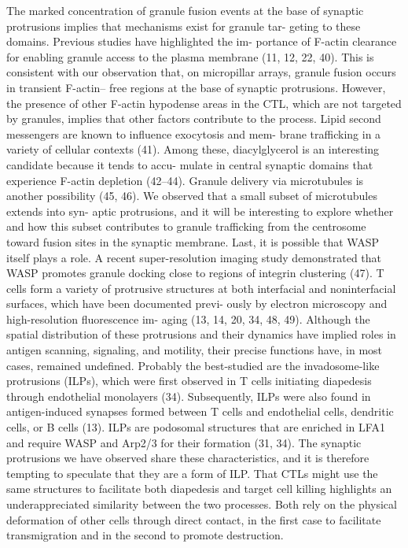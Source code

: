 The marked concentration of granule fusion events at the base of synaptic protrusions implies that mechanisms exist for granule tar- geting to these domains. Previous studies have highlighted the im- portance of F-actin clearance for enabling granule access to the plasma membrane (11, 12, 22, 40). This is consistent with our observation that, on micropillar arrays, granule fusion occurs in transient F-actin– free regions at the base of synaptic protrusions. However, the presence of other F-actin hypodense areas in the CTL, which are not targeted by granules, implies that other factors contribute to the process. Lipid second messengers are known to influence exocytosis and mem- brane trafficking in a variety of cellular contexts (41). Among these, diacylglycerol is an interesting candidate because it tends to accu- mulate in central synaptic domains that experience F-actin depletion (42–44). Granule delivery via microtubules is another possibility (45, 46). We observed that a small subset of microtubules extends into syn- aptic protrusions, and it will be interesting to explore whether and how this subset contributes to granule trafficking from the centrosome toward fusion sites in the synaptic membrane. Last, it is possible that WASP itself plays a role. A recent super-resolution imaging study demonstrated that WASP promotes granule docking close to regions of integrin clustering (47). T cells form a variety of protrusive structures at both interfacial and noninterfacial surfaces, which have been documented previ- ously by electron microscopy and high-resolution fluorescence im- aging (13, 14, 20, 34, 48, 49). Although the spatial distribution of these protrusions and their dynamics have implied roles in antigen scanning, signaling, and motility, their precise functions have, in most cases, remained undefined. Probably the best-studied are the invadosome-like protrusions (ILPs), which were first observed in T cells initiating diapedesis through endothelial monolayers (34). Subsequently, ILPs were also found in antigen-induced synapses formed between T cells and endothelial cells, dendritic cells, or B cells (13). ILPs are podosomal structures that are enriched in LFA1 and require WASP and Arp2/3 for their formation (31, 34). The synaptic protrusions we have observed share these characteristics, and it is therefore tempting to speculate that they are a form of ILP. That CTLs might use the same structures to facilitate both diapedesis and target cell killing highlights an underappreciated similarity between the two processes. Both rely on the physical deformation of other cells through direct contact, in the first case to facilitate transmigration and in the second to promote destruction.

